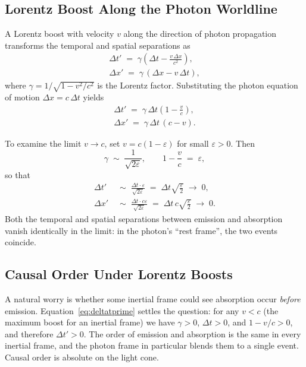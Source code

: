 \documentclass[11pt]{article}
\begin{document}
\subsection{Lorentz Boost Along the Photon Worldline}

A Lorentz boost with velocity $v$ along the direction of photon propagation transforms the temporal and spatial separations as
\begin{align}
\Delta t' \;=\; \gamma\!\left(\Delta t - \frac{v\,\Delta x}{c^2}\right),
\\[4pt]
\Delta x' \;=\; \gamma\,(\Delta x - v\,\Delta t),
\end{align}
where $\gamma = 1/\sqrt{1 - v^2/c^2}$ is the Lorentz factor. Substituting the photon equation of motion $\Delta x = c\,\Delta t$ yields
\begin{align}
\Delta t' \;=\; \gamma\,\Delta t\!\left(1 - \frac{v}{c}\right),
\label{eq:deltatprime}
\\[4pt]
\Delta x' \;=\; \gamma\,\Delta t\,(c - v).
\label{eq:deltaxprime}
\end{align}

To examine the limit $v \to c$, set $v = c(1 - \varepsilon)$ for small $\varepsilon > 0$. Then
\[
\gamma \;\sim\; \frac{1}{\sqrt{2\varepsilon}},
\qquad
1 - \frac{v}{c} \;=\; \varepsilon,
\]
so that
\begin{align}
\Delta t' &\;\sim\; \frac{\Delta t \cdot \varepsilon}{\sqrt{2\varepsilon}}
\;=\; \Delta t\sqrt{\frac{\varepsilon}{2}} \;\longrightarrow\; 0,
\\[4pt]
\Delta x' &\;\sim\; \frac{\Delta t \cdot c\varepsilon}{\sqrt{2\varepsilon}}
\;=\; \Delta t\, c\sqrt{\frac{\varepsilon}{2}} \;\longrightarrow\; 0.
\end{align}
Both the temporal and spatial separations between emission and absorption vanish identically in the limit: in the photon's ``rest frame'', the two events coincide.

\subsection{Causal Order Under Lorentz Boosts}

A natural worry is whether some inertial frame could see absorption occur \emph{before} emission. Equation~\eqref{eq:deltatprime} settles the question: for any $v < c$ (the maximum boost for an inertial frame) we have $\gamma > 0$, $\Delta t > 0$, and $1 - v/c > 0$, and therefore $\Delta t' > 0$. The order of emission and absorption is the same in every inertial frame, and the photon frame in particular blends them to a single event. Causal order is absolute on the light cone.
\end{document}
